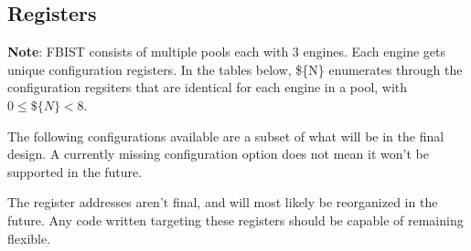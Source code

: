 \subsection{Registers}

\textbf{Note}: FBIST consists of multiple pools each with 3 engines.
Each engine gets unique configuration registers. In the tables
below, \$\{N\} enumerates through the configuration regsiters that are
identical for each engine in a pool, with $0 \leq \$\{N\} < 8$.

The following configurations available are a subset of what will be in
the final design. A currently missing configuration option does not
mean it won't be supported in the future.

The register addresses aren't final, and will most likely be
reorganized in the future. Any code written targeting these registers
should be capable of remaining flexible.

